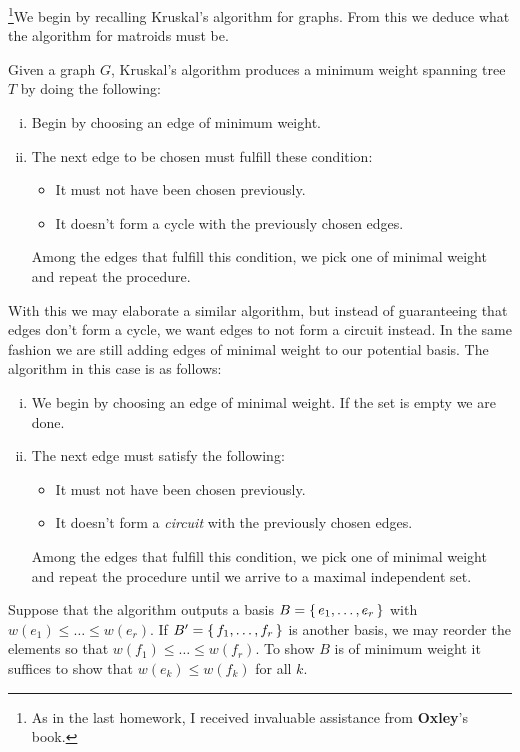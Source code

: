 \documentclass[12pt]{memoir}
\begin{document}
\begin{ptcbr}
    \footnote{As in the last homework, I received invaluable assistance from \textbf{Oxley}'s book.}We begin by recalling Kruskal's algorithm for graphs. From this we deduce what the algorithm for matroids must be.\par 
    Given a graph $G$, Kruskal's algorithm produces a minimum weight spanning tree $T$ by doing the following:
    \begin{enumerate}[i)]
        \itemsep=-0.4em
        \item Begin by choosing an edge of minimum weight.
        \item The next edge to be chosen must fulfill these condition:
        \begin{itemize}
            \itemsep=-0.4em 
            \item It must not have been chosen previously.
            \item It doesn't form a cycle with the previously chosen edges.
        \end{itemize}
        Among the edges that fulfill this condition, we pick one of minimal weight and repeat the procedure.
    \end{enumerate}
    With this we may elaborate a similar algorithm, but instead of guaranteeing that edges don't form a cycle, we want edges to not form a circuit instead. In the same fashion we are still adding edges of minimal weight to our potential basis. The algorithm in this case is as follows:
    \begin{enumerate}[i)]
        \itemsep=-0.4em
        \item We begin by choosing an edge of minimal weight. If the set is empty we are done.
        \item The next edge must satisfy the following:
        \begin{itemize}
            \itemsep=-0.4em 
            \item It must not have been chosen previously.
            \item It doesn't form a \emph{circuit} with the previously chosen edges.
        \end{itemize}
        Among the edges that fulfill this condition, we pick one of minimal weight and repeat the procedure until we arrive to a maximal independent set.
    \end{enumerate}
    Suppose that the algorithm outputs a basis $B=\{\,e_1,\dots,e_r\,\}$ with $w(e_1)\leq\dots\leq w(e_r)$. If $B'=\{\,f_1,\dots,f_r\,\}$ is another basis, we may reorder the elements so that $w(f_1)\leq\dots\leq w(f_r)$. To show $B$ is of minimum weight it suffices to show that $w(e_k)\leq w(f_k)$ for all $k$.\par 

\end{ptcbr}
\end{document}
